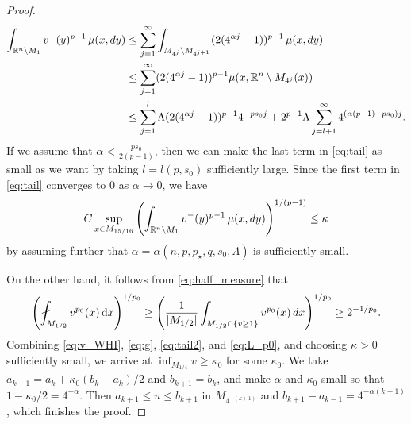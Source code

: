 \documentclass[11pt]{amsart}
\theoremstyle{plain}
\theoremstyle{definition}
\numberwithin{equation}{section}
\renewcommand{\d}{\textnormal{d}}
\newcommand{\R}{\mathbb{R}}
\begin{document}
\begin{proof}
\begin{equation}
\begin{split}
\int_{\R^n \setminus M_1} v^-(y)^{p-1} \,\mu(x, \d y)
&\leq \sum_{j=1}^\infty \int_{M_{4^j} \setminus M_{4^{j+1}}} (2(4^{\alpha j}-1))^{p-1} \,\mu(x, \d y) \\
&\leq \sum_{j=1}^\infty (2(4^{\alpha j}-1))^{p-1} \mu(x, \R^n \setminus M_{4^j}(x)) \\
&\leq \sum_{j=1}^l \Lambda(2(4^{\alpha j}-1))^{p-1} 4^{-ps_0 j} + 2^{p-1} \Lambda \sum_{j=l+1}^\infty 4^{(\alpha (p-1)-ps_0)j}.
\end{split}
\end{equation}
If we assume that $\alpha < \frac{ps_0}{2(p-1)}$, then we can make the last term in \eqref{eq:tail} as small as we want by taking $l = l(p,s_0)$ sufficiently large. Since the first term in \eqref{eq:tail} converges to 0 as $\alpha \to 0$, we have
\begin{equation} \label{eq:tail2}
C \sup_{x \in M_{15/16}} \left( \int_{\R^n\setminus M_1} v^-(y)^{p-1} \,\mu(x, \d y) \right)^{1/(p-1)} \leq \kappa
\end{equation}
by assuming further that $\alpha = \alpha(n, p, p_{\star}, q, s_0, \Lambda)$ is sufficiently small.

On the other hand, it follows from \eqref{eq:half_measure} that
\begin{equation} \label{eq:L_p0}
\left( \fint_{M_{1/2}} v^{p_0}(x) \,\mathrm{d}x \right)^{1/p_0} \geq \left( \frac{1}{|M_{1/2}|} \int_{M_{1/2} \cap \lbrace v \geq 1 \rbrace} v^{p_0}(x) \,\d x \right)^{1/p_0} \geq 2^{-1/p_0}.
\end{equation}
Combining \eqref{eq:v_WHI}, \eqref{eq:g}, \eqref{eq:tail2}, and \eqref{eq:L_p0}, and choosing $\kappa > 0$ sufficiently small, we arrive at $\inf_{M_{1/4}} v \geq \kappa_0$ for some $\kappa_0$. We take $a_{k+1} = a_k + \kappa_0 (b_k-a_k)/2$ and $b_{k+1}=b_k$, and make $\alpha$ and $\kappa_0$ small so that $1-\kappa_0/2 = 4^{-\alpha}$. Then $a_{k+1} \leq u \leq b_{k+1}$ in $M_{4^{-(k+1)}}$ and $b_{k+1}-a_{k-1} = 4^{-\alpha(k+1)}$, which finishes the proof.
\end{proof}
\end{document}
